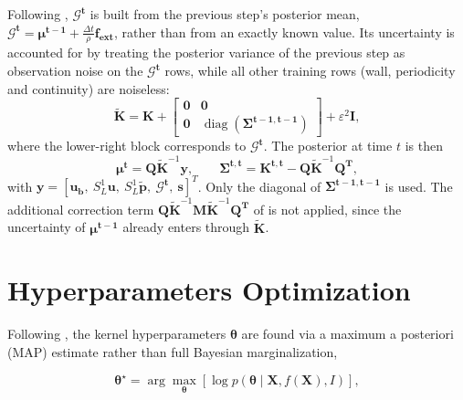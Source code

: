 \documentclass[11pt, a4paper]{report}
\begin{document}
\noindent Following \textcite{Raissi2018}, \(\boldsymbol{\mathcal{G}^t}\) is built from the previous
step's posterior mean, \(\boldsymbol{\mathcal{G}^t} = \boldsymbol{\mu^{t-1}} +
\frac{\Delta t}{\rho}\boldsymbol{f_{ext}}\), rather than from an exactly known value. Its
uncertainty is accounted for by treating the posterior variance of the previous step as
observation noise on the \(\boldsymbol{\mathcal{G}^t}\) rows, while all other training
rows (wall, periodicity and continuity) are noiseless:
\begin{equation}
    \tilde{\boldsymbol{K}} = \boldsymbol{K}
    + \begin{bmatrix} \boldsymbol{0} & \boldsymbol{0} \\
      \boldsymbol{0} & \operatorname{diag}\!\left(\boldsymbol{\Sigma^{t-1,t-1}}\right)
      \end{bmatrix}
    + \varepsilon^2 \boldsymbol{I},
    \label{eq:K-noise}
\end{equation}
where the lower-right block corresponds to \(\boldsymbol{\mathcal{G}^t}\). The posterior
at time \(t\) is then
\begin{equation}
    \boldsymbol{\mu^t} = \boldsymbol{Q}\tilde{\boldsymbol{K}}^{-1}\boldsymbol{y}, \qquad
    \boldsymbol{\Sigma^{t,t}} = \boldsymbol{K^{t,t}} - \boldsymbol{Q}\tilde{\boldsymbol{K}}^{-1}\boldsymbol{Q^T},
    \label{eq:posterior-propagated}
\end{equation}
with \(\boldsymbol{y} = [\boldsymbol{u_b},\ S^1_L\boldsymbol{u},\ S^1_L\tilde{\boldsymbol{p}},\
\boldsymbol{\mathcal{G}^t},\ \boldsymbol{s}]^T\). Only the diagonal of
\(\boldsymbol{\Sigma^{t-1,t-1}}\) is used. The additional correction term
\(\boldsymbol{Q}\tilde{\boldsymbol{K}}^{-1}\boldsymbol{M}\tilde{\boldsymbol{K}}^{-1}\boldsymbol{Q^T}\)
of \textcite{Raissi2018} is not applied, since the uncertainty of
\(\boldsymbol{\mu^{t-1}}\) already enters through \(\tilde{\boldsymbol{K}}\).

\section{Hyperparameters Optimization}
\label{sec:optimization}

Following \textcite{Molina2023}, the kernel hyperparameters \(\boldsymbol{\theta}\) are
found via a maximum a posteriori (MAP) estimate rather than full Bayesian
marginalization,

\begin{equation}
    \boldsymbol{\theta}^\star = \arg\max_{\boldsymbol{\theta}} \left[\log p(\boldsymbol{\theta} \mid \boldsymbol{X}, f(\boldsymbol{X}), I)\right],
\end{equation}
\end{document}
